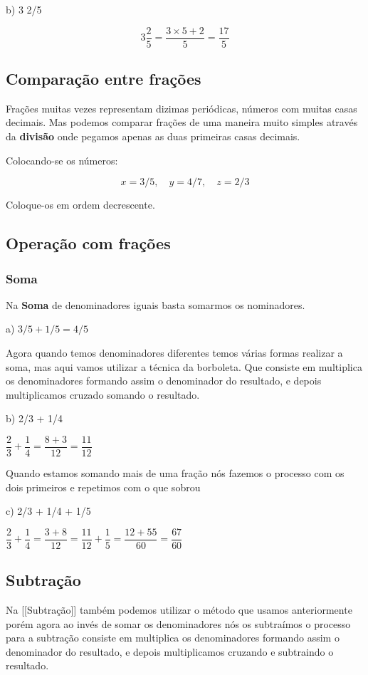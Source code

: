 \documentclass[letterpaper]{book}
\begin{document}
b) 3 2/5

\[3\dfrac{2}{5} = \dfrac{3 \times 5 + 2}{5} = \dfrac{17}{5}\]

\subsection{Comparação entre frações}

Frações muitas vezes representam dizimas periódicas, números com muitas casas decimais. Mas podemos comparar frações de uma maneira muito simples através da \textbf{divisão} onde pegamos apenas as duas primeiras casas decimais.

Colocando-se os números:

\[x=3/5, \quad y=4/7, \quad z=2/3\]

Coloque-os em ordem decrescente.

\subsection{Operação com frações}

\subsubsection{Soma}

Na \textbf{Soma} de denominadores iguais basta somarmos os nominadores.

a) \(3/5 + 1/5 = 4/5\)

Agora quando temos denominadores diferentes temos várias formas realizar a soma, mas aqui vamos utilizar a técnica da borboleta. Que consiste em multiplica os denominadores formando assim o denominador do resultado, e depois multiplicamos cruzado somando o resultado.

b) 2/3 + 1/4 

\(\dfrac{2}{3} + \dfrac{1}{4} = \dfrac{8+3}{12} = \dfrac{11}{12}\)

Quando estamos somando mais de uma fração nós fazemos o processo com os dois primeiros e repetimos com o que sobrou

c) 2/3 + 1/4 + 1/5

\(\dfrac{2}{3} + \dfrac{1}{4} = \dfrac{3 + 8}{12} = \dfrac{11}{12} + \dfrac{1}{5} = \dfrac{12+55}{60} = \dfrac{67}{60}\)

\subsection{Subtração}

Na [[Subtração]] também podemos utilizar o método que usamos anteriormente porém agora ao invés de somar os denominadores nós os subtraímos o processo para a subtração consiste em multiplica os denominadores formando assim o denominador do resultado, e depois multiplicamos cruzando e subtraindo o resultado.
\end{document}
